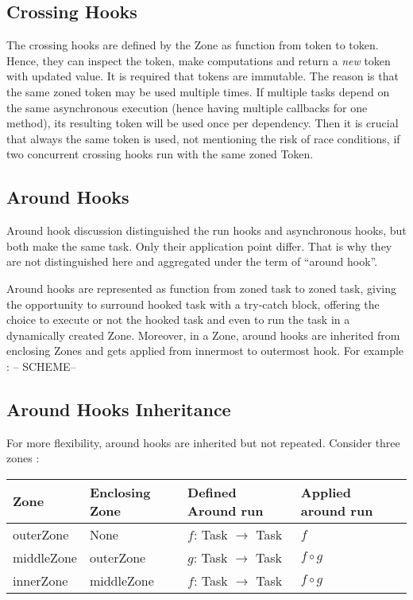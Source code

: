 \subsection*{Crossing Hooks}

The crossing hooks are defined by the Zone as function from token to token. Hence, they can inspect the token, make computations and return a \emph{new} token with updated value. It is required that tokens are immutable. The reason is that the same zoned token may be used multiple times. If multiple tasks depend on the same asynchronous execution (hence having multiple callbacks for one method), its resulting token will be used once per dependency. Then it is crucial that always the same token is used, not mentioning the risk of race conditions, if two concurrent crossing hooks run with the same zoned Token.

\subsection*{Around Hooks}

Around hook discussion distinguished the run hooks and asynchronous hooks, but both make the same task. Only their application point differ. That is why they are not distinguished here and aggregated under the term of ``around hook''.

Around hooks are represented as function from zoned task to zoned task, giving the opportunity to surround hooked task with a try-catch block, offering the choice  to execute or not the hooked task and even to run the task in a dynamically created Zone. Moreover, in a Zone, around hooks are inherited from enclosing Zones and gets applied from innermost
to outermost hook. For example : -- SCHEME--

\subsection*{Around Hooks Inheritance}

For more flexibility, around hooks are inherited but not repeated. Consider three zones :

\begin{tabular}{|l|l|l|l|}
\hline
Zone & Enclosing Zone & Defined Around run & Applied around run 
\\\hline
outerZone & None & $f$: Task $\rightarrow$ Task & $f$
\\\hline
middleZone & outerZone & $g$: Task $\rightarrow$ Task & $f \circ g$
\\\hline
innerZone & middleZone & $f$: Task $\rightarrow$ Task & $f \circ g$
\\\hline
\end{tabular}

